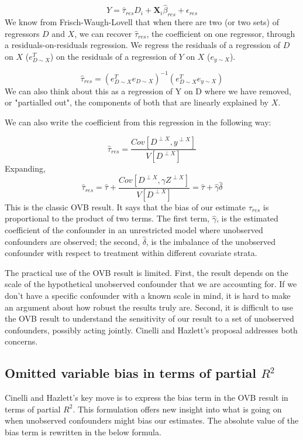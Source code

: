 \documentclass[hidelinks,11pt]{article}
\begin{document}
$$Y = \hat \tau_{res}D_i + \pmb{X}_i\hat \beta_{res} + \epsilon_{res}$$
We know from Frisch-Waugh-Lovell that when there are two (or two sets) of regressors $D$ and $X$, we can recover $\hat \tau_{res}$, the coefficient on one regressor, through a residuals-on-residuals regression. We regress the residuals of a regression of $D$ on $X$ ($e^T_{D\sim X}$) on the residuals of a regression of $Y$ on $X$ ($e_{y\sim X}$).

$$\hat \tau_{res}= (e^T_{D\sim X}e_{D \sim X})^{-1}(e^T_{D \sim X}e_{y\sim X})$$
We can also think about this as a regression of Y on D where we have removed,  or "partialled out", the components of both that are linearly explained by $X$.

We can also write the coefficient from this regression in the following way:

$$\hat \tau_{res} = \frac{Cov[D^{\perp X},y^{\perp X}]}{V[D^{\perp X}]}$$
Expanding,
$$\hat \tau_{res}= \hat \tau + \frac{Cov[D^{\perp X},\gamma Z^{\perp X}]}{V[D^{\perp X}]} = \hat \tau + \hat \gamma \hat \delta$$
This is the classic OVB result. It says that the bias of our estimate $\tau_{res}$ is proportional to the product of two terms. The first term, $\hat \gamma$, is the estimated coefficient of the confounder in an unrestricted model where unobserved confounders are observed; the second, $\hat \delta$, is the imbalance of the unobserved confounder with respect to treatment within different covariate strata.

The practical use of the OVB result is limited. First, the result depends on the scale of the hypothetical unobserved confounder that we are accounting for. If we don't have a specific confounder with a known scale in mind, it is hard to make an argument about how robust the results truly are. Second, it is difficult to use the OVB result to understand the sensitivity of our result to a set of unobserved confounders, possibly acting jointly. Cinelli and Hazlett's proposal addresses both concerns.

\subsection{Omitted variable bias in terms of partial $R^2$}

Cinelli and Hazlett's key move is to express the bias term in the OVB result in terms of partial $R^2$. This formulation offers new insight into what is going on when unobserved confounders might bias our estimates. The absolute value of the bias term is rewritten in the below formula.
\end{document}
